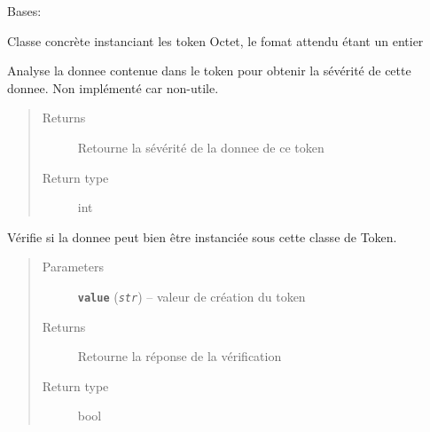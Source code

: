 \documentclass[letterpaper,10pt,english]{sphinxmanual}
\begin{document}

\begin{fulllineitems}
\label{loganalyser:loganalyser.token.Byte}
Bases: {\hyperref[loganalyser:loganalyser.token.Token]{\emph{}}}

Classe concrète instanciant les token Octet, le fomat attendu étant un entier

\begin{fulllineitems}
\label{loganalyser:loganalyser.token.Byte._Token__analyse}
Analyse la donnee contenue dans le token pour obtenir la sévérité de cette donnee. Non implémenté car non-utile.
\begin{quote}\begin{description}
\item[{Returns}] \leavevmode
Retourne la sévérité de la donnee de ce token

\item[{Return type}] \leavevmode
int

\end{description}\end{quote}

\end{fulllineitems}


\begin{fulllineitems}
\label{loganalyser:loganalyser.token.Byte._Token__verifier_type}
Vérifie si la donnee peut bien être instanciée sous cette classe de Token.
\begin{quote}\begin{description}
\item[{Parameters}] \leavevmode
\textbf{\texttt{value}} (\emph{\texttt{str}}) -- valeur de création du token

\item[{Returns}] \leavevmode
Retourne la réponse de la vérification

\item[{Return type}] \leavevmode
bool

\end{description}\end{quote}

\end{fulllineitems}


\end{fulllineitems}
\end{document}
